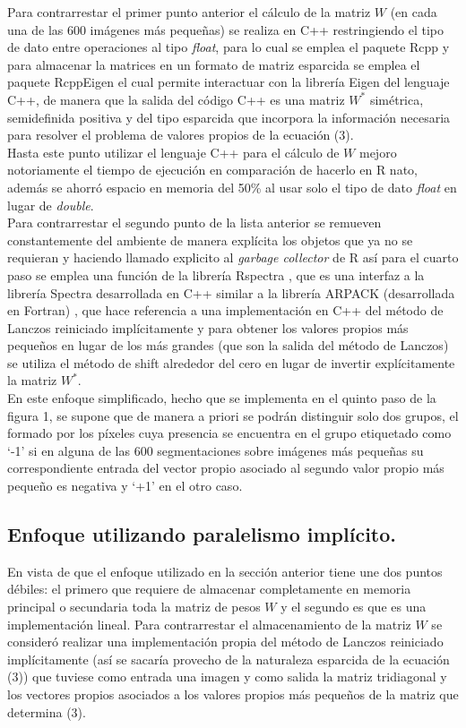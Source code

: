 \documentclass[conference]{IEEEtran}
\begin{document}
Para contrarrestar el primer punto anterior el cálculo de la matriz $W$ (en cada una de las 600 imágenes más pequeñas) se realiza en C++ restringiendo el tipo de dato entre operaciones al tipo \textit{float}, para lo cual se emplea el paquete Rcpp \cite{Rcpp} y para almacenar la matrices en un formato de matriz esparcida se emplea el paquete RcppEigen \cite{RcppEigen} el cual permite interactuar con la librería Eigen del lenguaje C++, de manera que la salida del código C++ es una matriz $W^*$ simétrica, semidefinida positiva y del tipo esparcida que incorpora la información necesaria para resolver el problema de valores propios de la ecuación (3).\\ 

Hasta este punto utilizar el lenguaje C++ para el cálculo de $W$ mejoro notoriamente el tiempo de ejecución en comparación de hacerlo en R nato, además se ahorró espacio en memoria del 50\% al usar solo el tipo de dato \textit{float} en lugar de \textit{double}. \\

Para contrarrestar el segundo punto de la lista anterior se remueven constantemente del ambiente de manera explícita los objetos que ya no se requieran y haciendo llamado explicito al \textit{garbage collector} de R así para el cuarto paso se emplea una función de la librería Rspectra \cite{RSpectra}, que es una interfaz a la librería Spectra desarrollada en C++ similar a la librería ARPACK\cite{Arpack} (desarrollada en Fortran) , que hace referencia a una implementación en C++ del método de Lanczos reiniciado implícitamente y para obtener los valores propios más pequeños en lugar de los más grandes (que son la salida del método de Lanczos) se utiliza el método de shift alrededor del cero en lugar de invertir explícitamente la matriz $W^*$.\\

En este enfoque simplificado, hecho que se implementa en el quinto paso de la figura 1, se supone que de manera a priori se podrán distinguir solo dos grupos, el formado por los píxeles cuya presencia se encuentra en el grupo etiquetado como ‘-1’ si en alguna de las 600 segmentaciones sobre imágenes más pequeñas su correspondiente entrada del vector propio asociado al segundo valor propio más pequeño es negativa y ‘+1’ en el otro caso.

\subsection{Enfoque utilizando paralelismo implícito.}
En vista de que el enfoque utilizado en la sección anterior tiene une dos puntos débiles: el primero que requiere de almacenar completamente en memoria principal o secundaria toda la matriz de pesos $W$ y el segundo es que es una implementación lineal. Para contrarrestar el almacenamiento de la matriz $W$ se consideró realizar una implementación propia del método de Lanczos reiniciado implícitamente (así se sacaría provecho de la naturaleza esparcida de la ecuación (3)) que tuviese como entrada una imagen y como salida la matriz tridiagonal y los vectores propios asociados a los valores propios más pequeños de la matriz que determina (3).\\
\end{document}
